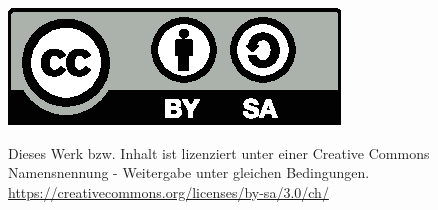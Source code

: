 \begin{center}
   \begin{minipage}[tc]{0.3\textwidth}
      \includegraphics[width=\textwidth]{images/by-sa}
   \end{minipage}
   \begin{minipage}[tc]{0.1\textwidth}
   \end{minipage}
   \begin{minipage}[tc]{0.6\textwidth}
      Dieses Werk bzw. Inhalt ist lizenziert unter einer Creative Commons Namensnennung - Weitergabe unter gleichen Bedingungen. \url{https://creativecommons.org/licenses/by-sa/3.0/ch/}
   \end{minipage}

\end{center}
\thispagestyle{empty}
\rmfamily
\cleardoublepage

\setcounter{tocdepth}{2}
\tableofcontents	%
